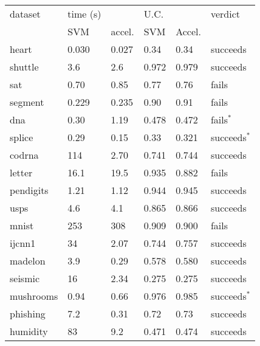 \begin{tabular}{|l|ll|ll|l|}
	\hline
dataset & time (s) & & U.C. & & verdict \\
 & SVM & accel. & SVM & Accel. & \\
	\hline
heart & 0.030 & 0.027 & 0.34 & 0.34 & succeeds \\
shuttle & 3.6 & 2.6 & 0.972 & 0.979 & succeeds \\
	sat & 0.70 & 0.85 & 0.77 & 0.76 & fails \\
segment & 0.229 & 0.235 & 0.90 & 0.91 & fails \\
	dna & 0.30 & 1.19 & 0.478 & 0.472 & fails$^*$ \\
	splice & 0.29 & 0.15 & 0.33 & 0.321 & succeeds$^*$ \\
	codrna & 114 & 2.70 & 0.741 & 0.744 & succeeds \\
	letter & 16.1 & 19.5 & 0.935 & 0.882 & fails \\
	pendigits & 1.21 & 1.12 & 0.944 & 0.945 & succeeds \\
	usps & 4.6 & 4.1 & 0.865 & 0.866 & succeeds \\
	mnist & 253 & 308 & 0.909 & 0.900 & fails \\
	ijcnn1 & 34 & 2.07 & 0.744 & 0.757 & succeeds \\
	madelon & 3.9 & 0.29 & 0.578 & 0.580 & succeeds \\
	seismic & 16 & 2.34 & 0.275 & 0.275 & succeeds \\
	mushrooms & 0.94 & 0.66 & 0.976 & 0.985 & succeeds$^*$ \\
	phishing & 7.2 & 0.31 & 0.72 & 0.73 & succeeds \\
	humidity & 83 & 9.2 & 0.471 & 0.474 & succeeds \\
	\hline
\end{tabular}
